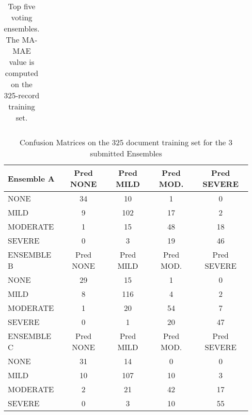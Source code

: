 \begin{table}
\begin{tabular}{|cllc|}
    \end{tabular}
    \caption{Top five voting ensembles. The \textsf{MA-MAE} value
    is computed on the 325-record training set.}
    \label{tab:ourEnsembles}
\end{table}





\begin{table}
\centering
    \begin{tabular}{|l|c|c|c|c|}
   \hline
   \textsf{ \cellcolor{gray!15} Ensemble A } & \textsf{ Pred NONE } & \textsf{ Pred MILD } & \textsf{ Pred MOD. } & \textsf{ Pred SEVERE } \\ 
    \hline
    \textsf{ NONE } & \cellcolor{gray!15} 34 & 10 & 1 & 0 \\ 
    \textsf{ MILD } & 9 & \cellcolor{gray!15} 102 & 17 & 2 \\ 
    \textsf{ MODERATE } & 1 & 15 & \cellcolor{gray!15} 48 & 18 \\ 
    \textsf{ SEVERE } & 0 & 3 & 19 & \cellcolor{gray!15} 46 \\ 
   \hline
   \textsf{ \cellcolor{gray!15} ENSEMBLE B } & \textsf{ Pred NONE } & \textsf{ Pred MILD } & \textsf{ Pred MOD. } & \textsf{ Pred SEVERE } \\ 
    \hline
    \textsf{ NONE } & \cellcolor{gray!15} 29 & 15 & 1 & 0 \\ 
    \textsf{ MILD } & 8 & \cellcolor{gray!15} 116 & 4 & 2 \\ 
    \textsf{ MODERATE } & 1 & 20 & \cellcolor{gray!15} 54 & 7 \\ 
    \textsf{ SEVERE } & 0 & 1 & 20 & \cellcolor{gray!15} 47 \\ 
   \hline
   \textsf{ \cellcolor{gray!15} ENSEMBLE C } & \textsf{ Pred NONE } & \textsf{ Pred MILD } & \textsf{ Pred MOD. } & \textsf{ Pred SEVERE } \\ 
    \hline
    \textsf{ NONE } & \cellcolor{gray!15} 31 & 14 & 0 & 0 \\ 
    \textsf{ MILD } & 10 & \cellcolor{gray!15} 107 & 10 & 3 \\ 
    \textsf{ MODERATE } & 2 & 21 & \cellcolor{gray!15} 42 & 17 \\ 
    \textsf{ SEVERE } & 0 & 3 & 10 & \cellcolor{gray!15} 55 \\ 
    \hline
    \end{tabular}    
    \caption{Confusion Matrices on the 325 document training set for the 3 submitted Ensembles}
    \label{tab:EnsembleTrainConfusionMatrix}
\end{table}

